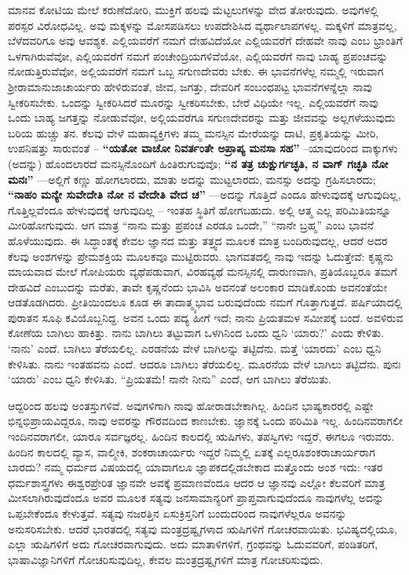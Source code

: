 ಮಾನವ ಕೋಟಿಯ ಮೇಲೆ ಕರುಣೆದೋರಿ, ಮುಕ್ತಿಗೆ ಹಲವು ಮೆಟ್ಟಲುಗಳನ್ನು ವೇದ ತೋರುವುದು. ಅವುಗಳಲ್ಲಿ ಪರಸ್ಪರ ವಿರೋಧವಿಲ್ಲ. ಅವು ಮಕ್ಕಳನ್ನು ಮೋಸಪಡಿಸಲು ಉಪದೇಶಿಸಿದ ವ್ಯರ್ಥಾಲಾಪಗಳಲ್ಲ. ಮಕ್ಕಳಿಗೆ ಮಾತ್ರವಲ್ಲ, ಬೆಳೆದವರಿಗೂ ಅವು ಆವಶ್ಯಕ. ಎಲ್ಲಿಯವರೆಗೆ ನಮಗೆ ದೇಹವಿದೆಯೋ ಎಲ್ಲಿಯವರೆಗೆ ದೇಹವೇ ನಾವು ಎಂಬ ಭ್ರಾಂತಿಗೆ ಒಳಗಾಗಿರುವೆವೋ, ಎಲ್ಲಿಯವರೆಗೆ ನಮಗೆ ಪಂಚೇಂದ್ರಿಯಗಳಿವೆಯೋ, ಎಲ್ಲಿಯವರೆಗೆ ನಾವು ಬಾಹ್ಯ ಪ್ರಪಂಚವನ್ನು ನೋಡುತ್ತಿರುವೆವೋ, ಅಲ್ಲಿಯವರೆಗೆ ನಮಗೆ ಒಬ್ಬ ಸಗುಣದೇವರು ಬೇಕು. ಈ ಭಾವನೆಗಳೆಲ್ಲ ನಮ್ಮಲ್ಲಿ ಇರುವಾಗ ಶ‍್ರೀರಾಮಾನುಜಾಚಾರ್ಯರು ಹೇಳಿರುವಂತೆ, ಜೀವ, ಜಗತ್ತು, ದೇವರಿಗೆ ಸಂಬಂಧಪಟ್ಟ ಭಾವನೆಗಳನ್ನೆಲ್ಲಾ ನಾವು ಸ್ವೀಕರಿಸಬೇಕು. ಒಂದನ್ನು ಸ್ವೀಕರಿಸಿದರೆ ಮೂರನ್ನು ಸ್ವೀಕರಿಸಬೇಕು, ಬೇರೆ ವಿಧಿಯೇ ಇಲ್ಲ. ಎಲ್ಲಿಯವರೆಗೆ ನಾವು ಒಂದು ಬಾಹ್ಯ ಜಗತ್ತನ್ನು ನೋಡುವೆವೋ, ಅಲ್ಲಿಯವರೆಗೂ ಸಗುಣದೇವರನ್ನು ಮತ್ತು ಜೀವವನ್ನು ಅಲ್ಲಗಳೆಯುವುದು ಬರಿಯ ಹುಚ್ಚು ತನ. ಕೆಲವು ವೇಳೆ ಮಹಾವ್ಯಕ್ತಿಗಳು ತಮ್ಮ ಮನಸ್ಸಿನ ಮೇರೆಯನ್ನು ದಾಟಿ, ಪ್ರಕೃತಿಯನ್ನು ಮೀರಿ, ಉಪನಿಷತ್ತು ಸಾರುವಂತೆ – \textbf{“ಯತೋ ವಾಚೋ ನಿವರ್ತಂತೇ ಅಪ್ರಾಪ್ಯ ಮನಸಾ ಸಹ”} –ಯಾವುದರಿಂದ ವಾಕ್ಕುಗಳು (ಅದನ್ನು) ಹೊಂದಲಾರದೆ ಮನಸ್ಸಿನೊಂದಿಗೆ ಹಿಂತಿರುಗುವುವೊ; \textbf{“ನ ತತ್ರ ಚುಕ್ಷುರ್ಗಚ್ಛತಿ, ನ ವಾಗ್​ ಗಚ್ಛತಿ ನೋ ಮನಃ”} —ಅಲ್ಲಿಗೆ ಕಣ್ಣು ಹೋಗಲಾರದು, ಮಾತು ಅದನ್ನು ಮುಟ್ಟಲಾರದು, ಮನಸ್ಸು ಅದನ್ನು ಗ್ರಹಿಸಲಾರದು; \textbf{“ನಾಹಂ ಮನ್ಯೇ ಸುವೇದೇತಿ ನೋ ನ ವೇದೇತಿ ವೇದ ಚ”} —ಅದನ್ನು ಗೊತ್ತಿದೆ ಎಂದೂ ಹೇಳುವುದಕ್ಕೆ ಆಗುವುದಿಲ್ಲ, ಗೊತ್ತಿಲ್ಲವೆಂದೂ ಹೇಳುವುದಕ್ಕೆ ಆಗುವುದಿಲ್ಲ – ಇಂತಹ ಸ್ಥಿತಿಗೆ ಹೋಗಬಹುದು. ಅಲ್ಲಿ ಆತ್ಮ ಎಲ್ಲ ಪರಿಮಿತಿಯನ್ನೂ ಮೀರಿಹೋಗುವುದು. ಆಗ ಮಾತ್ರ “ನಾನು ಮತ್ತು ಪ್ರಪಂಚ ಎರಡೂ ಒಂದೇ,” “ನಾನೇ ಬ್ರಹ್ಮ” ಎಂಬ ಭಾವನೆ ಹೊಳೆಯುವುದು. ಈ ಸಿದ್ಧಾಂತಕ್ಕೆ ಕೇವಲ ಜ್ಞಾನದ ಮತ್ತು ತತ್ತ್ವದ ಮೂಲಕ ಮಾತ್ರ ಬಂದಿರುವುದಲ್ಲ, ಆದರೆ ಅದರ ಕೆಲವು ಅಂಶಗಳನ್ನು ಪ್ರೇಮಶಕ್ತಿಯ ಮೂಲಕವೂ ಮುಟ್ಟಿರುವರು. ಭಾಗವತದಲ್ಲಿ ನಾವು ಇದನ್ನು ಓದುತ್ತೇವೆ: ಕೃಷ್ಣನು ಮಾಯವಾದ ಮೇಲೆ ಗೋಪಿಯರು ವ್ಯಥೆಪಡುವಾಗ, ವಿರಹವ್ಯಥೆ ಮನಸ್ಸಿನಲ್ಲಿ ದಾರುಣವಾಗಿ, ಪ್ರತಿಯೊಬ್ಬರೂ ತಮಗೆ ದೇಹವಿದೆ ಎಂಬುದನ್ನು ಮರೆತು, ತಾವೇ ಕೃಷ್ಣನೆಂದು ಭಾವಿಸಿ ಅವನಂತೆ ಅಲಂಕಾರ ಮಾಡಿಕೊಂಡು ಅವನಂತೆಯೇ ಆಡತೊಡಗಿದರು. ಪ್ರೀತಿಯಿಂದಲೂ ಕೂಡ ಈ ತಾದಾತ್ಮ್ಯಭಾವ ಬರುವುದೆಂದು ನಮಗೆ ಗೊತ್ತಾಗುತ್ತದೆ. ಪರ್ಷಿಯಾದಲ್ಲಿ ಪುರಾತನ ಸೂಫಿ ಕವಿಯೊಬ್ಬನಿದ್ದ. ಅವನ ಒಂದು ಪದ್ಯ ಹೀಗೆ ಇದೆ; ನಾನು ಪ್ರಿಯತಮಳ ಸಮೀಪಕ್ಕೆ ಬಂದೆ. ಅವಳಿರುವ ಕೋಣೆಯ ಬಾಗಿಲು ಹಾಕಿತ್ತು. ನಾನು ಬಾಗಿಲು ತಟ್ಟುವಾಗ ಒಳಗಿನಿಂದ ಒಂದು ಧ್ವನಿ ‘ಯಾರು?’ ಎಂದು ಕೇಳಿತು. ‘ನಾನು’ ಎಂದೆ. ಬಾಗಿಲು ತೆರೆಯ\-ಲಿಲ್ಲ. ಎರಡನೆಯ ವೇಳೆ ಬಾಗಿಲನ್ನು ತಟ್ಟಿದೆನು. ಮತ್ತೆ ‘ಯಾರದು’ ಎಂಬ ಧ್ವನಿ ಕೇಳಿಸಿತು. ನಾನು ಇಂತಹವನು ಎಂದೆ. ಆದರೂ ಬಾಗಿಲು ತೆರೆಯಲಿಲ್ಲ. ಮೂರನೆಯ ವೇಳೆ ಬಾಗಿಲು ತಟ್ಟಿದೆನು. ಪುನಃ ‘ಯಾರು’ ಎಂಬ ಧ್ವನಿ ಕೇಳಿಸಿತು. “ಪ್ರಿಯತಮೆ! ನಾನೇ ನೀನು” ಎಂದೆ, ಆಗ ಬಾಗಿಲು ತೆರೆಯಿತು.

ಆದ್ದರಿಂದ ಹಲವು ಅಂತಸ್ತುಗಳಿವೆ. ಅವುಗಳಿಗಾಗಿ ನಾವು ಹೋರಾಡಬೇಕಾಗಿಲ್ಲ. ಹಿಂದಿನ ಭಾಷ್ಯಕಾರರಲ್ಲಿ ಎಷ್ಟೇ ಭಿನ್ನಭಿಪ್ರಾಯವಿದ್ದರೂ, ನಾವು ಅವರನ್ನು ಗೌರವದಿಂದ ಕಾಣಬೇಕು. ಜ್ಞಾನಕ್ಕೆ ಒಂದು ಪರಿಮಿತಿ ಇಲ್ಲ. ಹಿಂದಿನವರಾಗಲೀ ಇಂದಿನವರಾಗಲೀ, ಯಾರೂ ಸರ್ವಜ್ಞರಲ್ಲ. ಹಿಂದಿನ ಕಾಲದಲ್ಲಿ ಋಷಿಗಳು, ತಪಸ್ವಿಗಳು ಇದ್ದರೆ, ಈಗಲೂ ಇರುವರು. ಹಿಂದಿನ ಕಾಲದಲ್ಲಿ ವ್ಯಾಸ, ವಾಲ್ಮೀಕಿ, ಶಂಕರಾಚಾರ್ಯರು ಇದ್ದರೆ ನಿಮ್ಮಲ್ಲಿ ಏತಕ್ಕೆ ಎಲ್ಲರೂ\break ಶಂಕರಾಚಾರ್ಯರಾಗ ಬಾರದು? ನಮ್ಮ ಧರ್ಮದ ವಿಷಯದಲ್ಲಿ ಯಾವಾಗಲೂ ಜ್ಞಾಪಕದಲ್ಲಿಡಬೇಕಾದ ಮತ್ತೊಂದು ಅಂಶ ಇದು: ಇತರ ಧರ್ಮಶಾಸ್ತ್ರಗಳು ಈಶ್ವರಪ್ರೇರಿತ ಜ್ಞಾನವೇ ಅವಕ್ಕೆ ಪ್ರಮಾಣವೆಂದೂ ಆದರ ಆ ಜ್ಞಾನವು ಎಲ್ಲೋ ಕೆಲವರಿಗೆ ಮಾತ್ರ ಮೀಸಲಾಗಿರುವುದೆಂದೂ ಅವರ ಮೂಲಕ ಸತ್ಯವು ಜನ\-ಸಾಮಾನ್ಯರಿಗೆ ಪ್ರಾಪ್ತವಾಗುವುದೆಂದೂ ನಾವುಗಳೆಲ್ಲ ಅದನ್ನು ಒಪ್ಪಬೇಕೆಂದೂ ಕೇಳುತ್ತವೆ. ಸತ್ಯವು ನಜರತ್ತಿನ ಏಸುಕ್ರಿಸ್ತನಿಗೆ ಬಂದುದರಿಂದ ನಾವುಗಳೆಲ್ಲರೂ ಅವನನ್ನು ಅನುಸರಿಸಬೇಕು. ಆದರೆ ಭಾರತದಲ್ಲಿ ಸತ್ಯವು ಮಂತ್ರದ್ರಷ್ಟೃಗಳಾದ ಋಷಿಗಳಿಗೆ ಗೋಚರವಾಯಿತು. ಭವಿಷ್ಯದಲ್ಲಿಯೂ, ಎಲ್ಲಾ ಋಷಿಗಳಿಗೆ ಅದು ಗೋಚರವಾಗುವುದು. ಅದು ಮಾತಾಳಿಗಳಿಗೆ, ಗ್ರಂಥವನ್ನು ಓದುವವರಿಗೆ, ಪಂಡಿತರಿಗೆ, ಭಾಷಾವಿಜ್ಞಾನಿಗಳಿಗೆ ಗೋಚರಿಸುವುದಿಲ್ಲ, ಕೇವಲ ಮಂತ್ರದ್ರಷ್ಟೃಗಳಿಗೆ ಮಾತ್ರ ಗೋಚರಿಸುವುದು.

